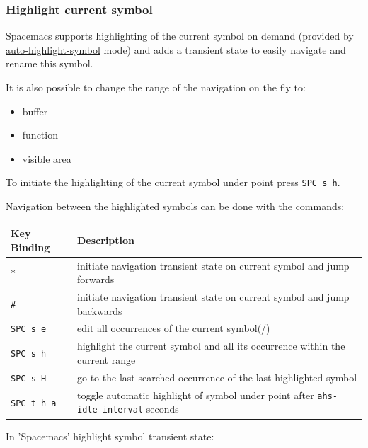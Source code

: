 \documentclass[11pt]{article}
\begin{document}
\subsubsection{Highlight current symbol}
\label{sec:org7d3c750}
Spacemacs supports highlighting of the current symbol on demand (provided by
\href{https://github.com/emacsmirror/auto-highlight-symbol}{auto-highlight-symbol} mode) and adds a transient state to easily navigate and rename
this symbol.

It is also possible to change the range of the navigation on the fly to:
\begin{itemize}
\item buffer
\item function
\item visible area
\end{itemize}

To initiate the highlighting of the current symbol under point press \texttt{SPC s h}.

Navigation between the highlighted symbols can be done with the commands:

\begin{center}
\begin{tabular}{ll}
Key Binding & Description\\
\hline
\texttt{*} & initiate navigation transient state on current symbol and jump forwards\\
\texttt{\#} & initiate navigation transient state on current symbol and jump backwards\\
\texttt{SPC s e} & edit all occurrences of the current symbol(/)\\
\texttt{SPC s h} & highlight the current symbol and all its occurrence within the current range\\
\texttt{SPC s H} & go to the last searched occurrence of the last highlighted symbol\\
\texttt{SPC t h a} & toggle automatic highlight of symbol under point after \texttt{ahs-idle-interval} seconds\\
\end{tabular}
\end{center}

In 'Spacemacs' highlight symbol transient state:
\end{document}
